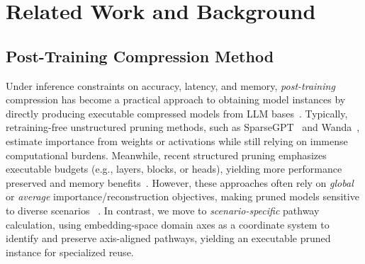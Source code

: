 \section{Related Work and Background}
\vspace{-1mm}
\subsection{Post-Training Compression Method}
\vspace{-1mm}
Under inference constraints on accuracy, latency, and memory, \emph{post-training} compression has become a practical approach to obtaining model instances by directly producing executable compressed models from LLM bases~\cite{han2016deepcompression,frankle2019lottery,wan2023efficientllm_survey}.
Typically, retraining-free unstructured pruning methods, such as SparseGPT~\cite{frantar2023sparsegpt} and Wanda~\cite{sun2023wanda}, estimate importance from weights or activations while still relying on immense computational burdens.
Meanwhile, recent structured pruning emphasizes executable budgets (e.g., layers, blocks, or heads), yielding more performance preserved and memory benefits~\cite{llmpruner2023,ashkboos2024slicegpt,yao2024gpruner,he2025olica}.
However, these approaches often rely on \emph{global} or \emph{average} importance/reconstruction objectives, making pruned models sensitive to diverse scenarios ~\cite{michel2019sixteen,lele2025rethinking_tfsp,yuan2023revisitingoodnlp,yang2024advoodrobustness}.
In contrast, we move to \emph{scenario-specific} pathway calculation, using embedding-space domain axes as a coordinate system to identify and preserve axis-aligned pathways, yielding an executable pruned instance for specialized reuse.
\vspace{-0.5mm}

